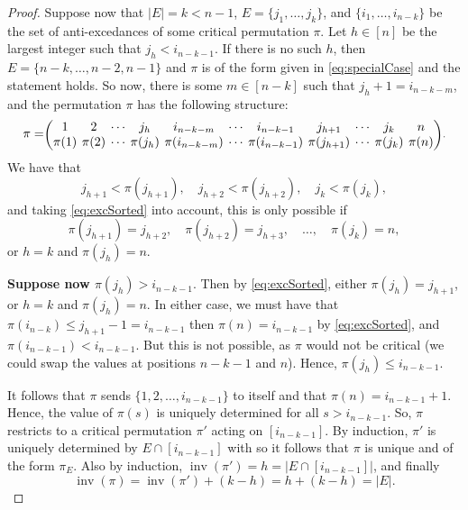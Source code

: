 \documentclass[reqno]{amsart}
\theoremstyle{definition}
\DeclareMathOperator{\inv}{inv}
\begin{document}
\begin{proof}
	Suppose now that $|E|=k<n-1$, $E = \{j_1,\dotsc,j_k\}$, and $\{i_1,\dotsc,i_{n-k}\}$ be 
	the set of anti-excedances of some critical permutation $\pi$.
	Let $h \in [n]$ be the largest integer such that $j_h < i_{n-k-1}$.
	If there is no such $h$, then $E = \{n-k,\dotsc,n-2,n-1\}$
	and $\pi$ is of the form given in \eqref{eq:specialCase}
	and the statement holds.
	So now, there is some $m \in [n-k]$ such that $j_h+1=i_{n-k-m}$,
	and the permutation $\pi$ has the following structure:
	\[
	\pi =
	\begingroup
	\setcounter{MaxMatrixCols}{20}
	\setlength\arraycolsep{2pt}
	\scriptstyle{
		\begin{pmatrix}
			1      & 2      & \dotsb & j_h & i_{n-k-m}  & \dotsb   & i_{n-k-1}      & j_{h+1} & \dotsb    & j_{k} &  n \\
			\pi(1) & \pi(2) & \dotsb & \pi(j_h) & \pi(i_{n-k-m}) & \dotsb & \pi(i_{n-k-1}) & \pi(j_{h+1}) & \dotsb & \pi(j_{k})  & \pi(n)
	\end{pmatrix}}.
	\endgroup
	\]
	We have that
	\[
	j_{h+1} < \pi(j_{h+1}), \quad j_{h+2}<\pi(j_{h+2}), \quad j_{k}<\pi(j_{k}),
	\]
	and taking \eqref{eq:excSorted} into account, this is only possible if 
	\[
	\pi(j_{h+1}) = j_{h+2},\quad \pi(j_{h+2}) = j_{h+3},\quad \dotsc, \quad \pi(j_{k}) = n,
	\]
	or $h=k$ and $\pi(j_h)=n$.

	\textbf{Suppose now $\pi(j_h)>i_{n-k-1}$}. Then by \eqref{eq:excSorted},
	either $\pi(j_h)=j_{h+1}$, or $h=k$ and $\pi(j_h)=n$.
	In either case, we must have that
	$\pi(i_{n-k})\leq j_{h+1}-1= i_{n-k-1}$ then $\pi(n)= i_{n-k-1}$ by \eqref{eq:excSorted},
	 and $\pi(i_{n-k-1}) < i_{n-k-1}$.
	But this is not possible, as $\pi$ would not be critical (we could swap
	the values at positions $n-k-1$ and $n$).
	Hence, $\pi(j_h) \leq i_{n-k-1}$.
	\medskip 
	
	It follows that $\pi$ sends $\{1,2,\dotsc,i_{n-k-1}\}$ to itself
	and that $\pi(n) = i_{n-k-1} + 1$. Hence,
	the value of $\pi(s)$ is uniquely determined for all
	$s > i_{n-k-1}$.
	So, $\pi$ restricts to a critical permutation $\pi'$
	acting on $[i_{n-k-1}]$.
	By induction, $\pi'$ is uniquely determined by $E \cap [i_{n-k-1}]$ with 
	so it follows that $\pi$ is unique and of the form $\pi_E$.
	Also by induction, $\inv(\pi') = h = |E \cap [i_{n-k-1}]|$,
	and finally 
	\[
	\inv(\pi) = \inv(\pi') + (k-h) = h + (k-h) = |E|.
	\]
\end{proof}
\end{document}
